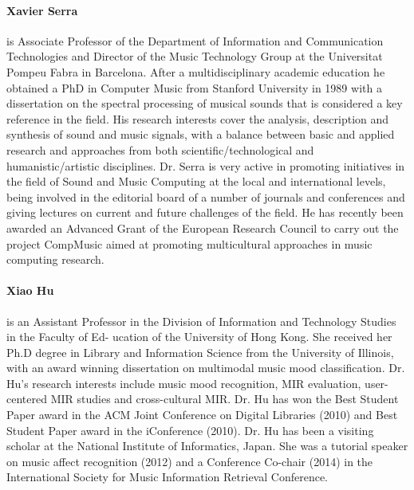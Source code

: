 {\paragraph{Xavier Serra} is Associate Professor of the Department of Information and Communication Technologies and Director of the Music Technology Group at the Universitat Pompeu Fabra in Barcelona. After a multidisciplinary academic education he obtained a PhD in Computer Music from Stanford University in 1989 with a dissertation on the spectral processing of musical sounds that is considered a key reference in the field. His research interests cover the analysis, description and synthesis of sound and music signals, with a balance between basic and applied research and approaches from both scientific/technological and humanistic/artistic disciplines. Dr. Serra is very active in promoting initiatives in the field of Sound and Music Computing at the local and international levels, being involved in the editorial board of a number of journals and conferences and giving lectures on current and future challenges of the field. He has recently been awarded an Advanced Grant of the European Research Council to carry out the project CompMusic aimed at promoting multicultural approaches in music computing research.

\paragraph{Xiao Hu} is an Assistant Professor in the Division of Information and Technology Studies in the Faculty of Ed- ucation of the University of Hong Kong. She received her Ph.D degree in Library and Information Science from the University of Illinois, with an award winning dissertation on multimodal music mood classification. Dr. Hu’s research interests include music mood recognition, MIR evaluation, user-centered MIR studies and cross-cultural MIR. Dr. Hu has won the Best Student Paper award in the ACM Joint Conference on Digital Libraries (2010) and Best Student Paper award in the iConference (2010). Dr. Hu has been a visiting scholar at the National Institute of Informatics, Japan. She was a tutorial speaker on music affect recognition (2012) and a Conference Co-chair (2014) in the International Society for Music Information Retrieval Conference.}

